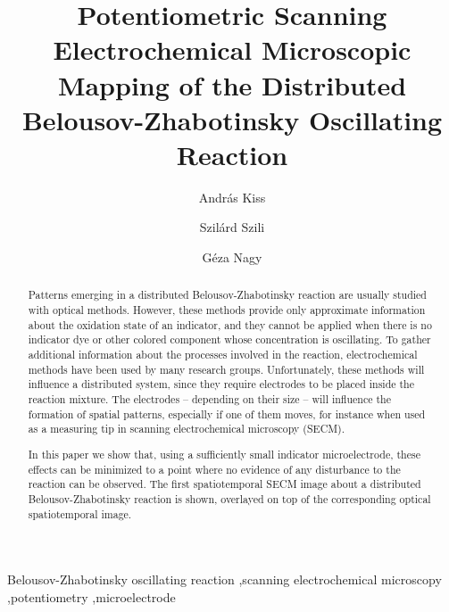 \documentclass[3p, twocolumn]{elsarticle}
\begin{document}
\begin{frontmatter}

\title{Potentiometric Scanning Electrochemical Microscopic Mapping of the Distributed Belousov-Zhabotinsky Oscillating Reaction}
\author[akiss]{András Kiss}
\author[szszilard]{Szilárd Szili}
\address[akiss, gnagy, szszilard]{Department of General and Physical Chemistry, Faculty of Sciences, University of Pécs, 7624 Pécs, Ifjúság útja 6, Hungary}
\address[akiss, gnagy]{János Szentágothai Research Centre, University of Pécs, 7624 Pécs, Ifjúság Útja 20, Hungary}
\author[gnagy]{Géza Nagy}


\begin{abstract}

Patterns emerging in a distributed Belousov-Zhabotinsky reaction are usually studied with optical methods.
However, these methods provide only approximate information about the oxidation state of an indicator, and they cannot be applied when there is no indicator dye or other colored component whose concentration is oscillating.
To gather additional information about the processes involved in the reaction, electrochemical methods have been used by many research groups.
Unfortunately, these methods will influence a distributed system, since they require electrodes to be placed inside the reaction mixture.
The electrodes -- depending on their size -- will influence the formation of spatial patterns, especially if one of them moves, for instance when used as a measuring tip in scanning electrochemical microscopy (SECM).

In this paper we show that, using a sufficiently small indicator microelectrode, these effects can be minimized to a point where no evidence of any disturbance to the reaction can be observed.
The first spatiotemporal SECM image about a distributed Belousov-Zhabotinsky reaction is shown, overlayed on top of the corresponding optical spatiotemporal image.

\end{abstract}
\begin{keyword}
	Belousov-Zhabotinsky oscillating reaction \sep scanning electrochemical microscopy \sep potentiometry \sep microelectrode
\end{keyword}
\end{frontmatter}
\end{document}
